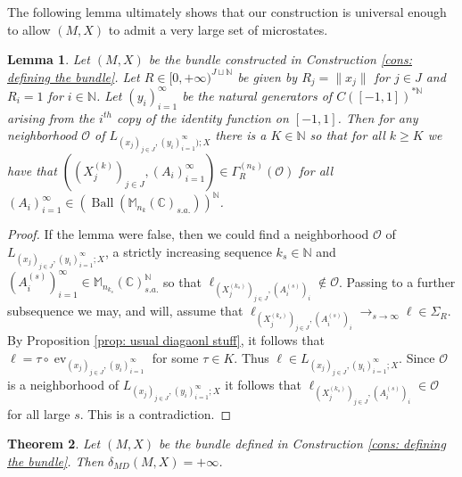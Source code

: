 \documentclass[10pt]{amsart}
\newtheorem{thm}{Theorem}[section]
\newtheorem{lem}[thm]{Lemma}
\theoremstyle{definition}
\numberwithin{equation}{section}
\newcommand{\bC}{{\mathbb C}}
\newcommand{\bM}{{\mathbb M}}
\newcommand{\bN}{{\mathbb N}}
\DeclareMathOperator{\ev}{ev}
\DeclareMathOperator{\Ball}{Ball}
\begin{document}
The following lemma ultimately shows that our construction is universal enough to allow $(M,X)$ to admit a very large set of microstates. 
\begin{lem}\label{lem: getting many microstates}
Let $(M,X)$ be the bundle constructed in Construction \ref{cons: defining the bundle}. Let $R\in [0,+\infty)^{J\sqcup \bN}$ be given by $R_{j}=\|x_{j}\|$ for $j\in J$ and $R_{i}=1$ for $i\in \bN$.  Let $(y_{i})_{i=1}^{\infty}$ be the natural generators of $C([-1,1])^{*\bN}$ arising from the $i^{th}$ copy of the identity function on $[-1,1]$. Then for any neighborhood $\mathcal{O}$ of $L_{(x_{j})_{j\in J},(y_{i})_{i=1}^{\infty});X}$ there is a $K\in \bN$ so that for all $k\geq K$ we have that $((X^{(k)}_{j})_{j\in J},(A_{i})_{i=1}^{\infty})\in \Gamma^{(n_{k})}_{R}(\mathcal{O})$ for all $(A_{i})_{i=1}^{\infty}\in (\Ball(\bM_{n_{k}}(\bC)_{s.a.}))^{\bN}$. 



\end{lem}


\begin{proof}
If the lemma were false, then we could find a neighborhood $\mathcal{O}$ of $L_{(x_{j})_{j\in J},(y_{i})_{i=1}^{\infty};X}$, a strictly increasing sequence $k_{s}\in \bN$ and $(A_{i}^{(s)})_{i=1}^{\infty}\in \bM_{n_{k_{s}}}(\bC)_{s.a.}^{\bN}$ so that $\ell_{(X^{(k_{s})}_{j})_{j\in J},(A_{i}^{(s)})_{i}}\notin \mathcal{O}$. Passing to a further subsequence we may, and will, assume that $\ell_{(X^{(k_{s})}_{j})_{j\in J},(A_{i}^{(s)})_{i}}\to_{s\to\infty}\ell\in \Sigma_{R}$. By Proposition \ref{prop: usual diagaonl stuff}, it follows that $\ell=\tau\circ \ev_{(x_{j})_{j\in J},(y_{i})_{i=1}^{\infty}}$ for some $\tau\in K$. Thus $\ell\in L_{(x_{j})_{j\in J},(y_{i})_{i=1}^{\infty};X}.$ Since $\mathcal{O}$ is a neighborhood of $L_{(x_{j})_{j\in J},(y_{i})_{i=1}^{\infty};X}$ it follows that $\ell_{(X^{(k_{s})}_{j})_{j\in J},(A_{i}^{(s)})_{i}}\in \mathcal{O}$ for all large $s$. This is a contradiction. 


\end{proof}


\begin{thm}\label{thm: infintie MD}
Let $(M,X)$ be the bundle defined in Construction \ref{cons: defining the bundle}. Then $\delta_{MD}(M,X)=+\infty$.

\end{thm}
\end{document}
